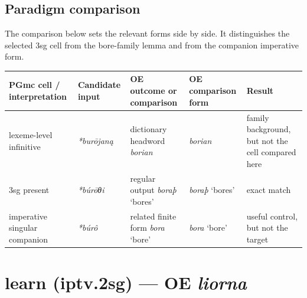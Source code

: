 \documentclass[
  british,
  a4paper,
  openany]{book}
\newcounter{none} %
\providecommand{\texorpdfstring}[2]{#1}
\begin{document}
\subsection{Paradigm comparison}\label{paradigm-comparison-21}

The comparison below sets the relevant forms side by side. It
distinguishes the selected 3sg cell from the bore-family lemma and from
the companion imperative form.

{\def\LTcaptype{none} %
\begin{longtable}[]{@{}
  >{\raggedright\arraybackslash}p{}
  >{\raggedright\arraybackslash}p{}
  >{\raggedright\arraybackslash}p{}
  >{\raggedright\arraybackslash}p{}
  >{\raggedright\arraybackslash}p{}@{}}
\toprule\noalign{}
\begin{minipage}[b]{\linewidth}\raggedright
PGmc cell / interpretation
\end{minipage} & \begin{minipage}[b]{\linewidth}\raggedright
Candidate input
\end{minipage} & \begin{minipage}[b]{\linewidth}\raggedright
OE outcome or comparison
\end{minipage} & \begin{minipage}[b]{\linewidth}\raggedright
OE comparison form
\end{minipage} & \begin{minipage}[b]{\linewidth}\raggedright
Result
\end{minipage} \\
\midrule\noalign{}
\endhead
\bottomrule\noalign{}
\endlastfoot
lexeme-level infinitive & {\emph{*burōjaną}} & dictionary headword
{\emph{borian}} & {\emph{borian}} & family background, but not the cell
compared here \\
3sg present & {\emph{*búrōθi}} & regular output {\emph{boraþ}} `bores' &
{\emph{boraþ}} `bores' & exact match \\
imperative singular companion & {\emph{*búrô}} & related finite form
{\emph{bora}} `bore' & {\emph{bora}} `bore' & useful control, but not
the target \\
\end{longtable}
}

\section{\texorpdfstring{learn (iptv.2sg) --- OE
\emph{liorna}}{learn (iptv.2sg) --- OE liorna}}\label{learn-iptv.2sg-oe-liorna}
\end{document}
